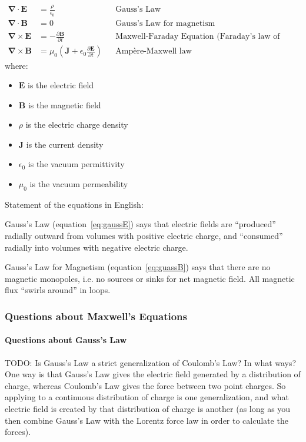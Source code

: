 \documentclass[a4paper]{article}
\theoremstyle{plain}
\theoremstyle{definition}
\newcommand{\vect}[1]{\textbf{#1}}
\newcommand{\del}{\bm{\nabla}}
\begin{document}
\begin{align}
  \del \cdot \vect{E} & = \frac{\rho}{\epsilon_0} & & \text{Gauss's Law} \label{eq:gaussE} \\
  \del \cdot \vect{B} & = 0 & & \text{Gauss's Law for magnetism} \label{eq:gaussB} \\
  \del \times \vect{E} & = - \frac{\partial \vect{B}}{\partial t} & & \text{Maxwell-Faraday Equation (Faraday's law of induction)} \label{eq:maxfar} \\
  \del \times \vect{B} & = \mu_0 ( \vect{J} + \epsilon_0 \frac{\partial \vect{E}}{\partial t} ) & & \text{Amp\`{e}re-Maxwell law} \label{eq:ampmax}
\end{align}
where:
\begin{itemize}
  \item $\vect{E}$ is the electric field
  \item $\vect{B}$ is the magnetic field
  \item $\rho$ is the electric charge density
  \item $\vect{J}$ is the current density
  \item $\epsilon_0$ is the vacuum permittivity
  \item $\mu_0$ is the vacuum permeability
\end{itemize}

Statement of the equations in English:

Gauss's Law (equation~\eqref{eq:gaussE}) says that electric fields are
``produced'' radially outward from volumes with positive electric
charge, and ``consumed'' radially into volumes with negative electric
charge.

Gauss's Law for Magnetism (equation~\eqref{eq:guassB}) says that there
are no magnetic monopoles, i.e. no sources or sinks for net magnetic
field.  All magnetic flux ``swirls around'' in loops.

\subsubsection{Questions about Maxwell's Equations}

\paragraph{Questions about Gauss's Law}

TODO: Is Gauss's Law a strict generalization of Coulomb's Law?  In
what ways?  One way is that Gauss's Law gives the electric field
generated by a distribution of charge, whereas Coulomb's Law gives the
force between two point charges.  So applying to a continuous
distribution of charge is one generalization, and what electric field
is created by that distribution of charge is another (as long as you
then combine Gauss's Law with the Lorentz force law in order to
calculate the forces).
\end{document}

